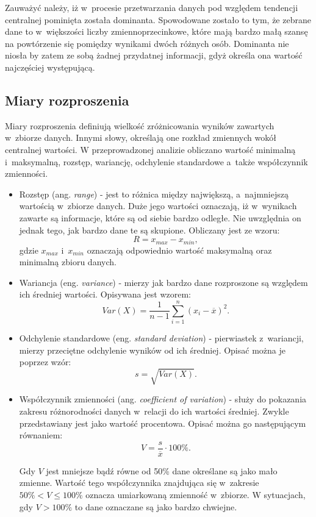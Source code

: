 \documentclass[a4paper,12pt,numbers=noenddot]{report}
\begin{document}
Zauważyć należy, iż w~procesie przetwarzania danych pod względem tendencji centralnej pominięta została dominanta. Spowodowane zostało to tym, że zebrane dane to w~większości liczby zmiennoprzecinkowe, które mają bardzo małą szansę na powtórzenie się pomiędzy wynikami dwóch różnych osób. Dominanta nie niosła by zatem ze sobą żadnej przydatnej informacji, gdyż określa ona wartość najczęściej występującą.

\subsection{Miary rozproszenia}
Miary rozproszenia definiują wielkość zróżnicowania wyników zawartych w~zbiorze danych. Innymi słowy, określają one rozkład zmiennych wokół centralnej wartości. W przeprowadzonej analizie obliczano wartość minimalną i~maksymalną, rozstęp, wariancję, odchylenie standardowe a~także współczynnik zmienności.
\begin{itemize}
\item
Rozstęp (ang. \textit{range}) - jest to różnica między największą, a~najmniejszą wartością w~zbiorze danych. Duże jego wartości oznaczają, iż w~wynikach zawarte są informacje, które są od siebie bardzo odległe. Nie uwzględnia on jednak tego, jak bardzo dane te są skupione. Obliczany jest ze wzoru:
\begin{equation}
\label{eq_range}
R = x_{max} - x_{min},
\end{equation}
gdzie $x_{max}$ i~$x_{min}$ oznaczają odpowiednio wartość maksymalną oraz minimalną zbioru danych.

\item
Wariancja (eng. \textit{variance}) - mierzy jak bardzo dane rozproszone są względem ich średniej wartości. Opisywana jest wzorem:
\begin{equation}
\label{eq_variance}
Var(X) = \frac{1}{n-1}\sum_{i=1}^{n}{(x_{i}-\overline{x})}^2.
\end{equation}
\item
Odchylenie standardowe (eng. \textit{standard deviation}) - pierwiastek z~wariancji, mierzy przeciętne odchylenie wyników od ich średniej. Opisać można je poprzez wzór:
\begin{equation}
\label{eq_stddev}
s = \sqrt{Var(X)}.
\end{equation}

\item
Współczynnik zmienności (ang. \textit{coefficient of variation}) - służy do pokazania zakresu różnorodności danych w~relacji do ich wartości średniej. Zwykle przedstawiany jest jako wartość procentowa. Opisać można go następującym równaniem:
\begin{equation}
\label{eq_stddev}
V = \frac{s}{\overline{x}}\cdot 100\%.
\end{equation}

Gdy $V$ jest mniejsze bądź równe od 50\% dane określane są jako mało zmienne. Wartość tego współczynnika znajdująca się w~zakresie $50\% < V \leq 100\%$ oznacza umiarkowaną zmienność w~zbiorze. W sytuacjach, gdy $V > 100\%$ to dane oznaczane są jako bardzo chwiejne.

\end{itemize}
\end{document}
